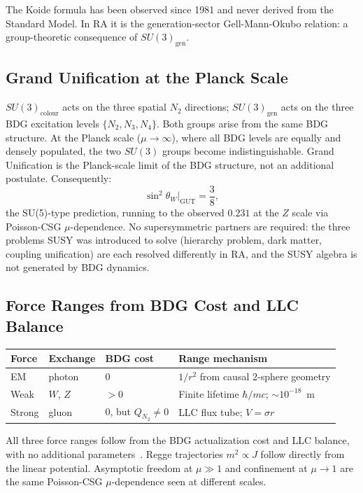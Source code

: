 \documentclass[11pt,a4paper]{article}
\begin{document}
The Koide formula has been observed since 1981 and never derived from
the Standard Model. In RA it is the generation-sector Gell-Mann-Okubo
relation: a group-theoretic consequence of $SU(3)_{\mathrm{gen}}$.

\subsection{Grand Unification at the Planck Scale}

$SU(3)_{\mathrm{colour}}$ acts on the three spatial $N_2$ directions;
$SU(3)_{\mathrm{gen}}$ acts on the three BDG excitation levels $\{N_2,
N_3, N_4\}$. Both groups arise from the same BDG structure. At the
Planck scale ($\mu \to \infty$), where all BDG levels are equally and
densely populated, the two $SU(3)$ groups become indistinguishable.
Grand Unification is the Planck-scale limit of the BDG structure,
not an additional postulate. Consequently:
\begin{equation}
  \sin^2\theta_W\big|_{\mathrm{GUT}} = \frac{3}{8},
  \label{eq:weinberg}
\end{equation}
the SU(5)-type prediction, running to the observed $0.231$ at the
$Z$ scale via Poisson-CSG $\mu$-dependence. No supersymmetric partners
are required: the three problems SUSY was introduced to solve (hierarchy
problem, dark matter, coupling unification) are each resolved differently
in RA, and the SUSY algebra is not generated by BDG dynamics.

\subsection{Force Ranges from BDG Cost and LLC Balance}

\begin{center}
\renewcommand{\arraystretch}{1.25}
\begin{tabular}{llll}
\toprule
Force & Exchange & BDG cost & Range mechanism \\
\midrule
EM & photon & 0 &
  $1/r^2$ from causal 2-sphere geometry \\
Weak & $W$, $Z$ & $>0$ &
  Finite lifetime $\hbar/mc$; $\sim 10^{-18}$~m \\
Strong & gluon & 0, but $Q_{N_2}\neq 0$ &
  LLC flux tube; $V = \sigma r$ \\
\bottomrule
\end{tabular}
\end{center}

\noindent
All three force ranges follow from the BDG actualization cost and LLC
balance, with no additional parameters~\citep{Sandeman2026RASM}. Regge
trajectories $m^2 \propto J$ follow directly from the linear potential.
Asymptotic freedom at $\mu \gg 1$ and confinement at $\mu \to 1$ are
the same Poisson-CSG $\mu$-dependence seen at different scales.
\end{document}
